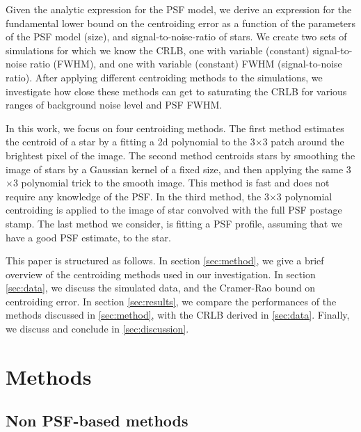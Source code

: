 \documentclass[12pt, preprint]{aastex}
\begin{document}
Given the analytic expression for the PSF model,
we derive an expression for the fundamental lower bound on the centroiding error as
a function of the parameters of the PSF model (\eg size),
and signal-to-noise-ratio of stars. We create two sets of simulations for which we 
know the CRLB, one with variable (constant) signal-to-noise ratio (FWHM), and one 
with variable (constant) FWHM (signal-to-noise ratio). After applying
different centroiding methods to the simulations,
we investigate how close these methods can get to saturating the CRLB for
various ranges of background noise level and PSF FWHM.

In this work, we focus on four centroiding methods. The first method
estimates the centroid of a star by a fitting a 2d polynomial to the 3$\times$3 patch around 
the brightest pixel of the image. The second method centroids stars by
 smoothing the image of stars by a Gaussian kernel of a fixed size,
 and then applying the same 3$\times$3 polynomial trick to the smooth
 image. This method is fast and does not require any knowledge of the 
PSF. In the third method, the 3$\times$3 polynomial centroiding is applied to the
 image of star convolved with the full PSF postage stamp. The last method we consider,
 is fitting a PSF profile, assuming that we have a good PSF estimate, to the star.

This paper is structured as follows. In section \ref{sec:method},
we give a brief overview of the centroiding methods used in our investigation.
In section \ref{sec:data}, we discuss the simulated data, and the Cramer-Rao bound
 on centroiding error. In section \ref{sec:results}, we compare the performances of the methods
discussed in \ref{sec:method}, with the CRLB derived in \ref{sec:data}. Finally,
 we discuss and conclude in \ref{sec:discussion}.               

\section{Methods}\label{sec:Centroiding methods}

\subsection{Non PSF-based methods}
\end{document}
